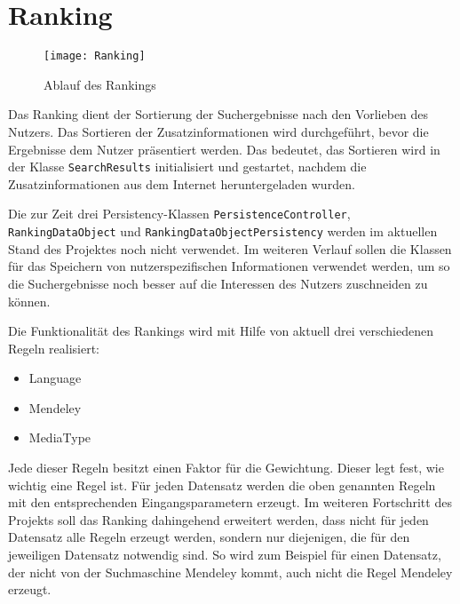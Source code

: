 
\section{Ranking}

\begin{figure}[ht]
	\centering
	\texttt{[image: Ranking]}
	\caption{Ablauf des Rankings}
\end{figure}

Das Ranking dient der Sortierung der Suchergebnisse nach den Vorlieben des Nutzers. Das Sortieren der Zusatzinformationen wird durchgeführt, bevor die Ergebnisse dem Nutzer präsentiert werden. Das bedeutet, das Sortieren wird in der Klasse \lstinline|SearchResults| initialisiert und gestartet, nachdem die Zusatzinformationen aus dem Internet heruntergeladen wurden.

Die zur Zeit drei Persistency-Klassen \lstinline|PersistenceController|, \lstinline|RankingDataObject| und \lstinline|RankingDataObjectPersistency| werden im aktuellen Stand des Projektes noch nicht verwendet. Im weiteren Verlauf sollen die Klassen für das Speichern von nutzerspezifischen Informationen verwendet werden, um so die Suchergebnisse noch besser auf die Interessen des Nutzers zuschneiden zu können.

\pagebreak
\clearpage

Die Funktionalität des Rankings wird mit Hilfe von aktuell drei verschiedenen Regeln realisiert:

\begin{itemize}
	\item Language
	\item Mendeley
	\item MediaType
\end{itemize}

Jede dieser Regeln besitzt einen Faktor für die Gewichtung. Dieser legt fest, wie wichtig eine Regel ist. Für jeden Datensatz werden die oben genannten Regeln mit den entsprechenden Eingangsparametern erzeugt. Im weiteren Fortschritt des Projekts soll das Ranking dahingehend erweitert werden, dass nicht für jeden Datensatz alle Regeln erzeugt werden, sondern nur diejenigen, die für den jeweiligen Datensatz notwendig sind. So wird zum Beispiel für einen Datensatz, der nicht von der Suchmaschine Mendeley kommt, auch nicht die Regel \glqq Mendeley\grqq\xspace erzeugt. 

